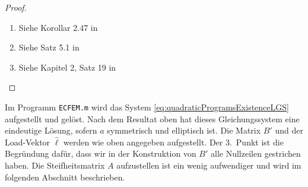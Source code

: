\documentclass{scrartcl}
\newcommand{\hl}{\hat{\ell}}
\begin{document}
\begin{proof}
	\begin{enumerate}
		\item
		Siehe Korollar 2.47 in \cite[S.59]{Gei-2002}
		\item
		Siehe Satz 5.1 in \cite[S.198]{Gei-2002}
		\item
		Siehe Kapitel 2, Satz 19 in \cite{Ged-2021a}
	\end{enumerate}
\end{proof}
Im Programm \texttt{ECFEM.m} wird das System \eqref{eq:quadraticProgramsExistenceLGS} aufgestellt und gelöst. Nach dem Resultat oben hat dieses Gleichungssystem eine eindeutige Lösung, sofern $a$ symmetrisch und elliptisch ist. Die Matrix $B'$ und der Load-Vektor $\hl$ werden wie oben angegeben aufgestellt.
Der 3.\ Punkt ist die Begründung dafür, dass wir in der Konstruktion von $B'$ alle Nullzeilen gestrichen haben. Die Steifheitsmatrix $A$ aufzustellen ist ein wenig aufwendiger und wird im folgenden Abschnitt beschrieben. 
\end{document}

